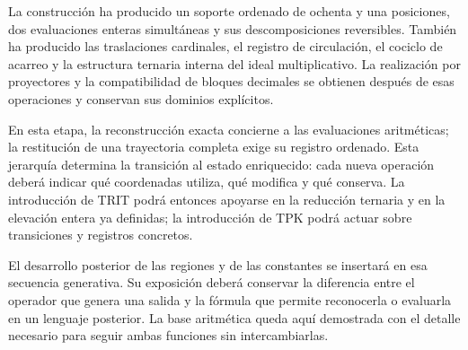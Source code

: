 La construcción ha producido un soporte ordenado de ochenta y una posiciones, dos evaluaciones enteras simultáneas y sus descomposiciones reversibles. También ha producido las traslaciones cardinales, el registro de circulación, el cociclo de acarreo y la estructura ternaria interna del ideal multiplicativo. La realización por proyectores y la compatibilidad de bloques decimales se obtienen después de esas operaciones y conservan sus dominios explícitos.

En esta etapa, la reconstrucción exacta concierne a las evaluaciones aritméticas; la restitución de una trayectoria completa exige su registro ordenado. Esta jerarquía determina la transición al estado enriquecido: cada nueva operación deberá indicar qué coordenadas utiliza, qué modifica y qué conserva. La introducción de TRIT podrá entonces apoyarse en la reducción ternaria y en la elevación entera ya definidas; la introducción de TPK podrá actuar sobre transiciones y registros concretos.

El desarrollo posterior de las regiones y de las constantes se insertará en esa secuencia generativa. Su exposición deberá conservar la diferencia entre el operador que genera una salida y la fórmula que permite reconocerla o evaluarla en un lenguaje posterior. La base aritmética queda aquí demostrada con el detalle necesario para seguir ambas funciones sin intercambiarlas.
